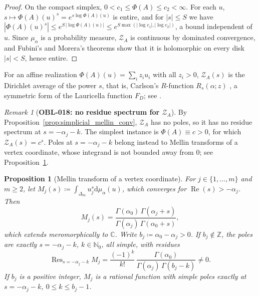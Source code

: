 \documentclass[11pt,a4paper,reqno]{amsart}
\newtheorem{proposition}[theorem]{Proposition}
\theoremstyle{definition}
\theoremstyle{remark}
\newtheorem{remark}[theorem]{Remark}
\numberwithin{equation}{section}
\newcommand{\dif}{\mathrm{d}}
\begin{document}
\begin{proof}
On the compact simplex, $0 < c_1 \le \Phi(A) \le c_2 < \infty$. For each $u$, $s \mapsto \Phi(A)(u)^s = e^{s\log\Phi(A)(u)}$ is entire, and for $|s| \le S$ we have $|\Phi(A)(u)^s| \le e^{S\,|\log\Phi(A)(u)|} \le e^{S \max(|\log c_1|, |\log c_2|)}$, a bound independent of $u$. Since $\mu_\alpha$ is a probability measure, $\mathcal{Z}_A$ is continuous by dominated convergence, and Fubini's and Morera's theorems show that it is holomorphic on every disk $|s| < S$, hence entire.
\end{proof}

\noindent For an affine realization $\Phi(A)(u) = \sum_i z_i u_i$ with all $z_i > 0$, $\mathcal{Z}_A(s)$ is the Dirichlet average of the power $s$, that is, Carlson's $R$-function $R_s(\alpha; z)$ \cite{Carlson1963}, a symmetric form of the Lauricella function $F_D$; see \cite[\S3.3.1]{Chow2022}.

\begin{remark}[\textbf{OBL-018: no residue spectrum for $\mathcal{Z}_A$}]
\label{thm:barnes_meromorphic_continuation}
By Proposition~\ref{prop:simplicial_mellin_conv}, $\mathcal{Z}_A$ has no poles, so it has no residue spectrum at $s = -\alpha_j - k$. The simplest instance is $\Phi(A) \equiv c > 0$, for which $\mathcal{Z}_A(s) = c^s$. Poles at $s = -\alpha_j - k$ belong instead to Mellin transforms of a vertex coordinate, whose integrand is not bounded away from $0$; see Proposition~\ref{prop:coordinate_mellin}.
\end{remark}

\begin{proposition}[Mellin transform of a vertex coordinate]
\label{prop:coordinate_mellin}
For $j \in \{1, \dots, m\}$ and $m \ge 2$, let $M_j(s) \coloneqq \int_{\Delta_m} u_j^s \dif\mu_\alpha(u)$, which converges for $\operatorname{Re}(s) > -\alpha_j$. Then
\begin{equation}
M_j(s) = \frac{\Gamma(\alpha_0)\,\Gamma(\alpha_j + s)}{\Gamma(\alpha_j)\,\Gamma(\alpha_0 + s)},
\end{equation}
which extends meromorphically to $\mathbb{C}$. Write $b_j \coloneqq \alpha_0 - \alpha_j > 0$. If $b_j \notin \mathbb{Z}$, the poles are exactly $s = -\alpha_j - k$, $k \in \mathbb{N}_0$, all simple, with residues
\begin{equation}
\operatorname{Res}_{s = -\alpha_j - k} M_j = \frac{(-1)^k}{k!}\,\frac{\Gamma(\alpha_0)}{\Gamma(\alpha_j)\,\Gamma(b_j - k)} \ne 0.
\end{equation}
If $b_j$ is a positive integer, $M_j$ is a rational function with simple poles exactly at $s = -\alpha_j - k$, $0 \le k \le b_j - 1$.
\end{proposition}
\end{document}

